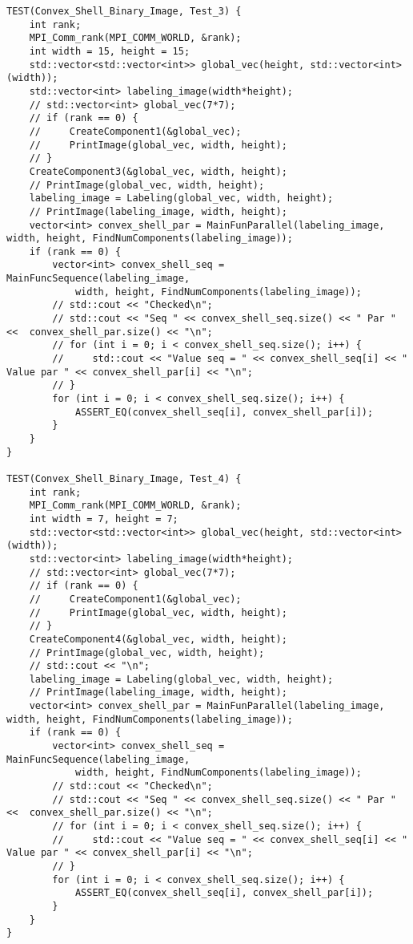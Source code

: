 \documentclass{report}
\begin{document}
\begin{lstlisting}
TEST(Convex_Shell_Binary_Image, Test_3) {
    int rank;
    MPI_Comm_rank(MPI_COMM_WORLD, &rank);
    int width = 15, height = 15;
    std::vector<std::vector<int>> global_vec(height, std::vector<int>(width));
    std::vector<int> labeling_image(width*height);
    // std::vector<int> global_vec(7*7);
    // if (rank == 0) {
    //     CreateComponent1(&global_vec);
    //     PrintImage(global_vec, width, height);
    // }
    CreateComponent3(&global_vec, width, height);
    // PrintImage(global_vec, width, height);
    labeling_image = Labeling(global_vec, width, height);
    // PrintImage(labeling_image, width, height);
    vector<int> convex_shell_par = MainFunParallel(labeling_image, width, height, FindNumComponents(labeling_image));
    if (rank == 0) {
        vector<int> convex_shell_seq = MainFuncSequence(labeling_image,
            width, height, FindNumComponents(labeling_image));
        // std::cout << "Checked\n";
        // std::cout << "Seq " << convex_shell_seq.size() << " Par " <<  convex_shell_par.size() << "\n";
        // for (int i = 0; i < convex_shell_seq.size(); i++) {
        //     std::cout << "Value seq = " << convex_shell_seq[i] << " Value par " << convex_shell_par[i] << "\n";
        // }
        for (int i = 0; i < convex_shell_seq.size(); i++) {
            ASSERT_EQ(convex_shell_seq[i], convex_shell_par[i]);
        }
    }
}

TEST(Convex_Shell_Binary_Image, Test_4) {
    int rank;
    MPI_Comm_rank(MPI_COMM_WORLD, &rank);
    int width = 7, height = 7;
    std::vector<std::vector<int>> global_vec(height, std::vector<int>(width));
    std::vector<int> labeling_image(width*height);
    // std::vector<int> global_vec(7*7);
    // if (rank == 0) {
    //     CreateComponent1(&global_vec);
    //     PrintImage(global_vec, width, height);
    // }
    CreateComponent4(&global_vec, width, height);
    // PrintImage(global_vec, width, height);
    // std::cout << "\n";
    labeling_image = Labeling(global_vec, width, height);
    // PrintImage(labeling_image, width, height);
    vector<int> convex_shell_par = MainFunParallel(labeling_image, width, height, FindNumComponents(labeling_image));
    if (rank == 0) {
        vector<int> convex_shell_seq = MainFuncSequence(labeling_image,
            width, height, FindNumComponents(labeling_image));
        // std::cout << "Checked\n";
        // std::cout << "Seq " << convex_shell_seq.size() << " Par " <<  convex_shell_par.size() << "\n";
        // for (int i = 0; i < convex_shell_seq.size(); i++) {
        //     std::cout << "Value seq = " << convex_shell_seq[i] << " Value par " << convex_shell_par[i] << "\n";
        // }
        for (int i = 0; i < convex_shell_seq.size(); i++) {
            ASSERT_EQ(convex_shell_seq[i], convex_shell_par[i]);
        }
    }
}


\end{lstlisting}
\end{document}
